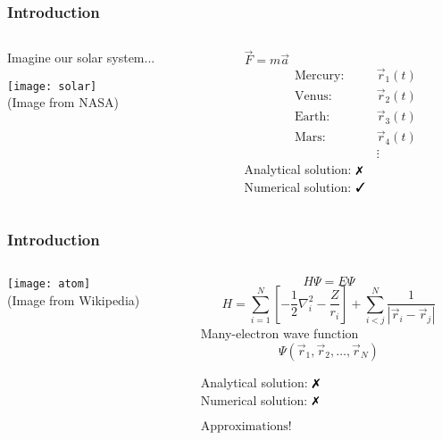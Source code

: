 \begin{frame}[t]
  \frametitle{Introduction}
  \begin{columns}
    \begin{column}{0.6\textwidth}
    Imagine our solar system...
    
    \vspace{1em}
    \texttt{[image: solar]} \\
    \scriptsize (Image from NASA)
    \end{column}
    \begin{column}{0.35\textwidth}
      \centering
      $\vec{F} = m\vec{a}$
      \begin{alignat*}{3}
      & \text{Mercury:} \quad && \vec{r}_1(t) \\
      & \text{Venus:}   \quad && \vec{r}_2(t) \\
      & \text{Earth:}   \quad && \vec{r}_3(t) \\
      & \text{Mars:}    \quad && \vec{r}_4(t) \\
      & && \vdots
      \end{alignat*}
      \pause Analytical solution: \alert{$\textrm{\ding{55}}$} \\
      Numerical solution: \emph{$\textrm{\ding{51}}$}
    \end{column}
  \end{columns}
\end{frame}

\begin{frame}[t]
  \frametitle{Introduction}
  \begin{columns}
    \begin{column}{0.35\textwidth}
    
    \vspace{1em}
    \texttt{[image: atom]} \\
    \scriptsize (Image from Wikipedia)
    \end{column}
    \begin{column}{0.6\textwidth}
      \[H \Psi = E \Psi\]
      \[H = \sum_{i=1}^N \left[ -\frac{1}{2} \nabla_i^2 - \frac{Z}{r_i} \right] + \sum_{i<j}^N \frac{1}{|\vec{r}_i - \vec{r}_j|}\]
      \centering
      Many-electron wave function
      \[\Psi(\vec{r}_1,\vec{r}_2,\ldots,\vec{r}_N)\]
      
      \pause Analytical solution: \alert{$\textrm{\ding{55}}$} \\
      Numerical solution: \alert{$\textrm{\ding{55}}$}
      
      \vspace{1em}
      \pause \emph{$\boxed{\text{Approximations!}}$}
    \end{column}
  \end{columns}
\end{frame}


